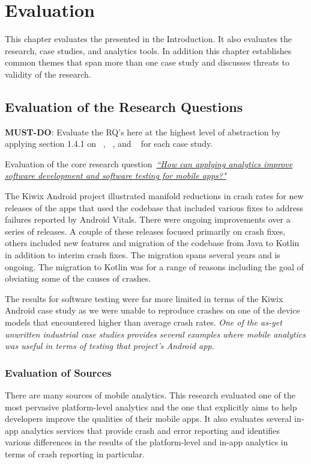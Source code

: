 \chapter{Evaluation}
\label{chapter-evaluation}

This chapter evaluates the \href{section-research-questions}{} presented in the Introduction. It also evaluates the research, case studies, and analytics tools. In addition this chapter establishes common themes that span more than one case study and discusses threats to validity of the research. 


\section{Evaluation of the Research Questions}
\textbf{MUST-DO}: Evaluate the RQ's here at the highest level of abstraction by applying section 1.4.1 on ~\href{section-sources}{}, ~\href{section-value}{}, and ~\href{section-impact}{} for each case study.

Evaluation of the core research question~\href{core-research-question}{\emph{``How can applying analytics improve software development and software testing for mobile apps?"}}

The Kiwix Android project illustrated manifold reductions in crash rates for new releases of the apps that used the codebase that included various fixes to address failures reported by Android Vitals. There were ongoing improvements over a series of releases. A couple of these releases focused primarily on crash fixes, others included new features and migration of the codebase from Java to Kotlin in addition to interim crash fixes. 
The migration spans several years and is ongoing. The migration to Kotlin was for a range of reasons including the goal of obviating some of the causes of crashes.

The results for software testing were far more limited in terms of the Kiwix Android case study as we were unable to reproduce crashes on one of the device models that encountered higher than average crash rates. \emph{One of the as-yet unwritten industrial case studies provides several examples where mobile analytics was useful in terms of testing that project's Android app.}

\subsection{Evaluation of Sources}
There are many sources of mobile analytics. This research evaluated one of the most pervasive platform-level analytics and the one that explicitly aims to help developers improve the qualities of their mobile apps. It also evaluates several in-app analytics services that provide crash and error reporting and identifies various differences in the results of the platform-level and in-app analytics in terms of crash reporting in particular.

